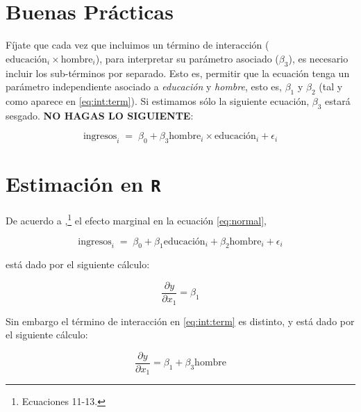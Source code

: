 \documentclass[onesided]{article}\usepackage[]{graphicx}\usepackage[]{color}
\begin{document}



\section*{Buenas Pr\'acticas}


F\'ijate que cada vez que incluimos un t\'ermino de interacci\'on ($\text{educaci\'on}_{i} \times {\text{hombre}}_{i}$), para interpretar su par\'ametro asociado ($\beta_{3}$), es necesario incluir los sub-t\'erminos por separado. Esto es, permitir que la ecuaci\'on tenga un par\'ametro independiente asociado a \emph{educaci\'on} y \emph{hombre}, esto es, $\beta_{1}$ y $\beta_{2}$ (tal y como aparece en \autoref{eq:int:term}). Si estimamos s\'olo la siguiente ecuaci\'on, $\beta_{3}$ estar\'a sesgado. {\bf NO HAGAS LO SIGUIENTE}:


    \begin{equation}\label{eq:int:term:mala}
      \text{ingresos}_{i} \;=\; \beta_{0} + \beta_{3}{\text{hombre}}_{i}\times \text{educaci\'on}_{i} + \epsilon_{i}
    \end{equation}



\section*{Estimaci\'on en \texttt{R}}

De acuerdo a \textcite[73]{Brambor2006},\footnote{Ecuaciones 11-13.} el efecto marginal en la ecuaci\'on \autoref{eq:normal},

    \begin{equation}\label{eq:normal}
      \text{ingresos}_{i} \;=\; \beta_{0} + \beta_{1}\text{educaci\'on}_{i} + \beta_{2}\text{hombre}_{i} + \epsilon_{i}
    \end{equation}

est\'a dado por el siguiente c\'alculo:

    \begin{equation}\label{ef:marg:normal}
      \frac{\partial y}{\partial x_{1}} = \beta_{1}
    \end{equation}

Sin embargo el t\'ermino de interacci\'on en \autoref{eq:int:term} es distinto, y est\'a dado por el siguiente c\'alculo:

    \begin{equation}\label{ef:marg:t:i}
      \frac{\partial y}{\partial x_{1}} = \beta_{1} + \beta_{3}\text{hombre}
    \end{equation} %
\end{document}
